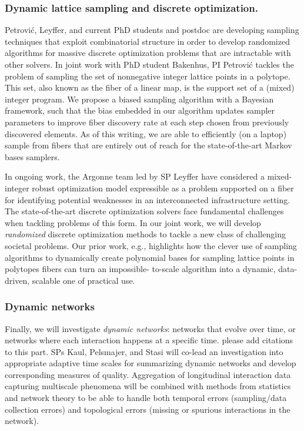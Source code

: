 \documentclass[11pt]{NSFamsart}
\begin{document}
 \subsubsection*{Dynamic lattice sampling and discrete optimization.} 
 Petrovi\'c, Leyffer, and current PhD students and postdoc are developing sampling techniques that exploit combinatorial structure in order to develop randomized algorithms for massive discrete optimization problems that are intractable with other solvers. In joint work with PhD student Bakenhus, PI Petrovi\'c tackles the problem of sampling the set of nonnegative integer lattice points in a polytope. This set, also known as the fiber of a linear map, is the support set of a (mixed) integer program. We propose a biased sampling algorithm with a Bayesian framework, such that  the bias embedded in our algorithm updates sampler parameters to improve fiber discovery rate at each step chosen from previously discovered elements. As of this writing, we are able to efficiently (on a laptop) sample from fibers that are entirely out of reach for the state-of-the-art Markov bases samplers. 

In ongoing work, the Argonne team led by SP Leyffer have considered a mixed-integer robust optimization model expressible as a problem supported on a fiber  for identifying potential weaknesses in an interconnected infrastructure setting.  The state-of-the-art discrete optimization solvers face fundamental challenges when tackling problems of this form. In our joint work, we will develop \emph{randomized} discrete optimization methods to tackle a new class of challenging societal problems. Our prior work, e.g., \cite{PShypergraphs}  highlights how the clever use of sampling algorithms to dynamically create polynomial bases for sampling lattice points in polytopes fibers can turn an impossible- to-scale algorithm into a dynamic, data-driven, scalable one of practical use.


\subsubsection*{Dynamic networks}
Finally, we will investigate {\it dynamic networks}: networks that evolve over time, or networks where each interaction happens at a specific time.  
{\color{cyan}please add citations to this part.} 
SPs Kaul, Pelsmajer, and Stasi will co-lead an  investigation into appropriate adaptive time scales  for summarizing dynamic networks and develop corresponding measures of quality. 
Aggregation of longitudinal interaction data capturing multiscale phenomena will be combined with methods from statistics and network theory to be able to handle both temporal errors (sampling/data collection errors) and topological errors (missing or spurious interactions in the network).
\end{document}
